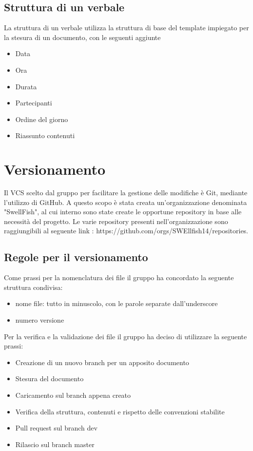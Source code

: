 \documentclass[12pt]{article}
\begin{document}
\subsection{Struttura di un verbale}
La struttura di un verbale utilizza la struttura di base del template impiegato per la stesura di un documento, con le seguenti aggiunte
\begin{itemize}
    \item Data
    \item Ora
    \item Durata
    \item Partecipanti
    \item Ordine del giorno
    \item Riassunto contenuti
\end{itemize}
\section{Versionamento}
Il VCS scelto dal gruppo per facilitare la gestione delle modifiche è Git, mediante l'utilizzo di GitHub.
A questo scopo è stata creata un'organizzazione denominata "SwellFish", al cui interno sono state create le opportune repository in base alle necessità del progetto.
Le varie repository presenti nell'organizzazione sono raggiungibili al seguente link : https://github.com/orgs/SWEllfish14/repositories.
\subsection{Regole per il versionamento}
Come prassi per la nomenclatura dei file il gruppo ha concordato la seguente struttura condivisa:
\begin{itemize}
    \item nome file: tutto in minuscolo, con le parole separate dall'underscore
    \item numero versione
\end{itemize}

Per la verifica e la validazione dei file il gruppo ha deciso di utilizzare la seguente prassi:
\begin{itemize}
    \item Creazione di un nuovo branch per un apposito documento
    \item Stesura del documento
    \item Caricamento sul branch appena creato
    \item Verifica della struttura, contenuti e rispetto delle convenzioni stabilite
    \item Pull request sul branch dev
    \item Rilascio sul branch master
\end{itemize}
\end{document}
